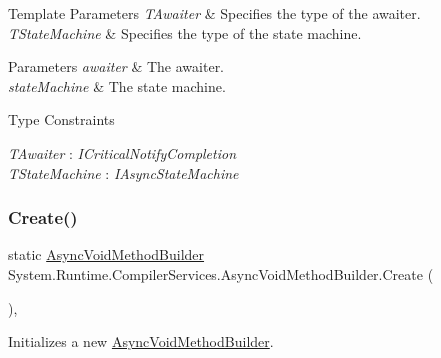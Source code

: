 \begin{DoxyTemplParams}{Template Parameters}
{\em T\+Awaiter} & Specifies the type of the awaiter.\\
\hline
{\em T\+State\+Machine} & Specifies the type of the state machine.\\
\hline
\end{DoxyTemplParams}

\begin{DoxyParams}{Parameters}
{\em awaiter} & The awaiter.\\
\hline
{\em state\+Machine} & The state machine.\\
\hline
\end{DoxyParams}
\begin{Desc}
\item[Type Constraints]\begin{description}
\item[{\em T\+Awaiter} : {\em I\+Critical\+Notify\+Completion}]\item[{\em T\+State\+Machine} : {\em I\+Async\+State\+Machine}]\end{description}
\end{Desc}
\mbox{\label{struct_system_1_1_runtime_1_1_compiler_services_1_1_async_void_method_builder_a235983bbb3e696c5831af5f6ed093994}} 
\subsubsection{\texorpdfstring{Create()}{Create()}}
{\footnotesize\ttfamily static \hyperlink{struct_system_1_1_runtime_1_1_compiler_services_1_1_async_void_method_builder}{Async\+Void\+Method\+Builder} System.\+Runtime.\+Compiler\+Services.\+Async\+Void\+Method\+Builder.\+Create (\begin{DoxyParamCaption}{ }\end{DoxyParamCaption})\hspace{0.3cm}{\ttfamily [inline]}, {\ttfamily [static]}}



Initializes a new \hyperlink{struct_system_1_1_runtime_1_1_compiler_services_1_1_async_void_method_builder}{Async\+Void\+Method\+Builder}.

